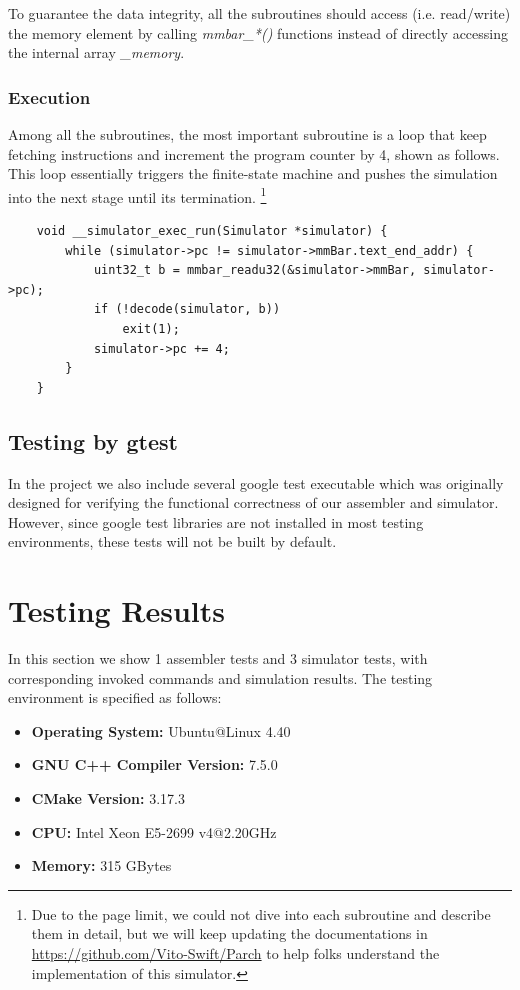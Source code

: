 \documentclass[conference, draftclsnofoot, letterpaper]{IEEETran}
\begin{document}
To guarantee the data integrity, all the subroutines should access (i.e. read/write) the memory element by calling \textit{mmbar\_*()} functions instead of directly accessing the internal array \textit{\_memory}.

\subsubsection{Execution}


Among all the subroutines, the most important subroutine is a loop that keep fetching instructions and increment the program counter by 4, shown as follows. This loop essentially triggers the finite-state machine and pushes the simulation into the next stage until its termination.  \footnote{Due to the page limit, we could not dive into each subroutine and describe them in detail, but we will keep updating the documentations in \url{https://github.com/Vito-Swift/Parch} to help folks understand the implementation of this simulator.}

\begin{lstlisting}
	void __simulator_exec_run(Simulator *simulator) {
		while (simulator->pc != simulator->mmBar.text_end_addr) {
			uint32_t b = mmbar_readu32(&simulator->mmBar, simulator->pc);
			if (!decode(simulator, b)) 
				exit(1);	
			simulator->pc += 4;
		}
	}
\end{lstlisting}

\subsection{Testing by gtest}

In the project we also include several google test executable which was originally designed for verifying the functional correctness of our assembler and simulator. However, since google test libraries are not installed in most testing environments, these tests will not be built by default. 

\section{Testing Results}

In this section we show 1 assembler tests and 3 simulator tests, with corresponding invoked commands and simulation results. The testing environment is specified as follows:

\begin{itemize}
	\item \textbf{Operating System: } Ubuntu@Linux 4.40
	\item \textbf{GNU C++ Compiler Version:} 7.5.0
	\item \textbf{CMake Version:} 3.17.3
	\item \textbf{CPU:} Intel Xeon E5-2699 v4@2.20GHz
	\item \textbf{Memory: } 315 GBytes
\end{itemize}
\end{document}

